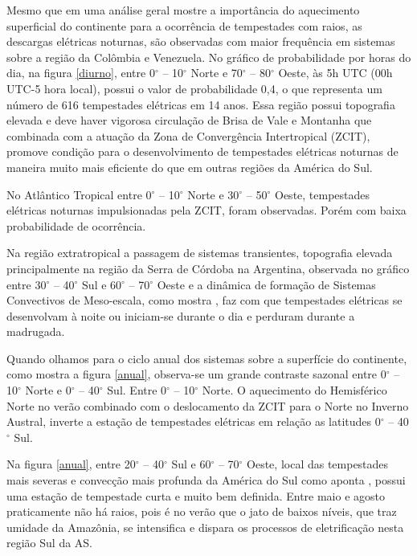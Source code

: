 Mesmo que em uma análise geral mostre a importância do aquecimento superficial do continente para a ocorrência de tempestades com raios, as descargas elétricas noturnas, são observadas com maior frequência em sistemas sobre a região da Colômbia e Venezuela. No gráfico de probabilidade por horas do dia, na figura \ref{diurno}, entre 0$^{\circ}$  -- 10$^{\circ}$ Norte e 70$^{\circ}$ -- 80$^{\circ}$ Oeste, às 5h UTC (00h UTC-5 hora local), possui o valor de probabilidade 0,4, o que representa um número de 616 tempestades elétricas em 14 anos. Essa região possui topografia elevada e deve haver vigorosa circulação de Brisa de Vale e Montanha que combinada com a atuação da Zona de Convergência Intertropical (ZCIT), promove condição para o desenvolvimento de tempestades elétricas noturnas de maneira muito mais eficiente do que em outras regiões da América do Sul. 

No Atlântico Tropical entre 0$^{\circ}$  -- 10$^{\circ}$ Norte e 30$^{\circ}$ -- 50$^{\circ}$ Oeste, tempestades elétricas noturnas impulsionadas pela ZCIT, foram observadas. Porém com baixa probabilidade de ocorrência.

Na região extratropical a passagem de sistemas transientes, topografia elevada principalmente na região da Serra de Córdoba na Argentina, observada no gráfico entre 30$^{\circ}$  -- 40$^{\circ}$ Sul e 60$^{\circ}$ -- 70$^{\circ}$ Oeste e a dinâmica de formação de Sistemas Convectivos de Meso-escala, como mostra \cite{Durkee2009}, faz com que tempestades elétricas se desenvolvam à noite ou iniciam-se durante o dia e perduram durante a madrugada.
 
Quando olhamos para o ciclo anual dos sistemas sobre a superfície do continente, como mostra a figura \ref{anual}, observa-se um grande contraste sazonal entre 0$^{\circ}$  -- 10$^{\circ}$ Norte e 0$^{\circ}$ -- 40$^{\circ}$ Sul. Entre 0$^{\circ}$  -- 10$^{\circ}$ Norte. O aquecimento do Hemisférico Norte no verão combinado com o deslocamento da ZCIT para o Norte no Inverno Austral, inverte a estação de tempestades elétricas em relação as latitudes 0$^{\circ}$ -- 40$^{\circ}$ Sul.

Na figura \ref{anual}, entre 20$^{\circ}$  -- 40$^{\circ}$ Sul e 60$^{\circ}$ -- 70$^{\circ}$ Oeste, local das tempestades mais severas e convecção mais profunda da América do Sul como aponta \cite{cecil2005, Romatschke2010}, possui uma estação de tempestade curta e muito bem definida. Entre maio e agosto praticamente não há raios, pois é no verão que o jato de baixos níveis, que traz umidade da Amazônia, se intensifica e dispara os processos de eletrificação nesta região Sul da AS.

